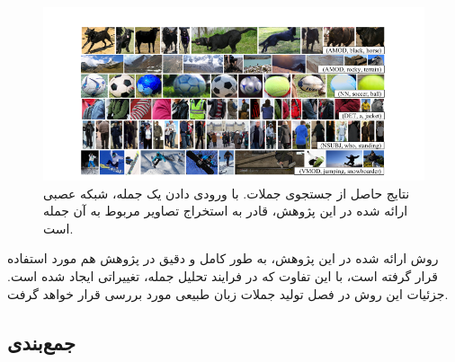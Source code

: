 \begin{figure}[H]
\center
\includegraphics[scale=0.6]{./Imgs/karpathy2014deep_res2.png}
\caption[نتایج حاصل از جستجوی جملات در روش ]{نتایج حاصل از جستجوی جملات. با ورودی دادن یک جمله، شبکه عصبی ارائه شده در این پژوهش، قادر به استخراج تصاویر مربوط به آن جمله است.\cite{karpathy2014deep}}
\label{fig:k2014res2}
\end{figure}

روش ارائه شده در این پژوهش، به طور کامل و دقیق در پژوهش \cite{Karpathy_2015_CVPR} هم مورد استفاده قرار گرفته است، با این تفاوت که در فرایند تحلیل جمله، تغییراتی ایجاد شده است. جزئیات این روش در فصل تولید جملات زبان طبیعی مورد بررسی قرار خواهد گرفت.

\subsection{جمع‌بندی}

